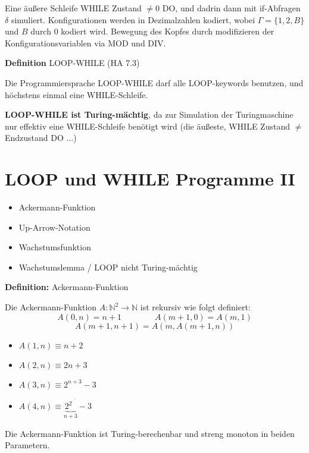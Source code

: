 \documentclass[a4paper,graphics,11pt]{article}
\begin{document}
Eine äußere Schleife WHILE Zustand $\neq 0$ DO, und dadrin dann mit if-Abfragen $\delta$ simuliert.
Konfigurationen werden in Dezimalzahlen kodiert, wobei $\Gamma = \{1,2,B\}$ und $B$ durch 0 kodiert wird.
Bewegung des Kopfes durch modifizieren der Konfigurationsvariablen via MOD und DIV.

\strut

\textbf{Definition} LOOP-WHILE (HA 7.3)

Die Programmiersprache LOOP-WHILE darf alle LOOP-keywords benutzen, und höchstens einmal
eine WHILE-Schleife.

\textbf{LOOP-WHILE ist Turing-mächtig}, da zur Simulation der Turingmaschine nur effektiv eine WHILE-Schleife
benötigt wird (die äußeste, WHILE Zustand $\neq$ Endzustand DO ...)



\newpage



\section{LOOP und WHILE Programme II}

\begin{itemize}
    \item Ackermann-Funktion
    \item Up-Arrow-Notation
    \item Wachstumsfunktion
    \item Wachstumslemma / LOOP nicht Turing-mächtig
\end{itemize}

\textbf{Definition:} Ackermann-Funktion

Die Ackermann-Funktion $A : \mathbb{N}^2 \to \mathbb{N}$ ist rekursiv wie folgt definiert:
$$
    A(0,n) = n+1
    \qquad\qquad
    A(m+1,0) = A(m,1)
$$$$
    A(m+1,n+1) = A(m, A(m+1,n))
$$
\begin{itemize}
    \item $A(1,n) \equiv n+2$
    \item $A(2,n) \equiv 2n+3$
    \item $A(3,n) \equiv 2^{n+3}-3$
    \item $A(4,n) \equiv \underbrace{2^{2^{.^{.^{.^2}}}}}_{n+3} - 3$
\end{itemize}

Die Ackermann-Funktion ist Turing-berechenbar und streng monoton in beiden Parametern.

\strut
\end{document}
